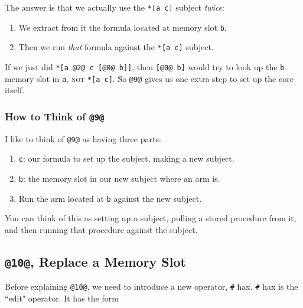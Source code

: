 \documentclass[twoside]{article}
\begin{document}
The answer is that we actually use the \lstinline[style=inlinecode]{*[a c]} subject \emph{twice}:

\begin{enumerate}
  \item  We extract from it the formula located at memory slot \lstinline[style=inlinecode]{b}.
  \item  Then we run \emph{that} formula against the \lstinline[style=inlinecode]{*[a c]} subject.
\end{enumerate}

If we just did \lstinline[style=inlinecode]{*[a @2@ c [@0@ b]]}, then \lstinline[style=inlinecode]{[@0@ b]} would try to look up the \lstinline[style=inlinecode]{b} memory slot in \lstinline[style=inlinecode]{a}, \textsc{not} \lstinline[style=inlinecode]{*[a c]}. So \lstinline[style=inlinecode]{@9@} gives us one extra step to set up the core itself.

\subsubsection{How to Think of \lstinline[style=inlinecode]{@9@}}

I like to think of \lstinline[style=inlinecode]{@9@} as having three parts:

\begin{enumerate}
  \item  \lstinline[style=inlinecode]{c}: our formula to set up the subject, making a new subject.
  \item  \lstinline[style=inlinecode]{b}: the memory slot in our new subject where an arm is.
  \item  Run the arm located at \lstinline[style=inlinecode]{b} against the new subject.
\end{enumerate}

\noindent
You can think of this as setting up a subject, pulling a stored procedure from it, and then running that procedure against the subject.

\subsection{\lstinline[style=inlinecode]{@10@}, Replace a Memory Slot}

Before explaining \lstinline[style=inlinecode]{@10@}, we need to introduce a new operator, \lstinline[style=inlinecode]{#} hax. \lstinline[style=inlinecode]{#} hax is the ``edit" operator. It has the form
\end{document}
